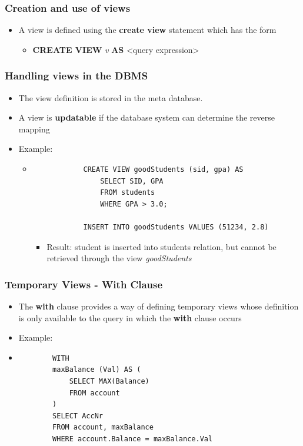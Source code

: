 \subsubsection{Creation and use of views}

\begin{itemize}
    \item A view is defined using the \textbf{create view} statement which has the form 
    \begin{itemize}
        \item[] \textbf{CREATE VIEW} \textit{v} \textbf{AS} <query expression>
    \end{itemize}
\end{itemize}

\subsubsection{Handling views in the DBMS}
\begin{itemize}
    \item The view definition is stored in the meta database.
    \item A view is \textbf{updatable} if the database system can determine the reverse mapping 
    \item Example:
    \begin{itemize}
        \item[] \begin{lstlisting}
            CREATE VIEW goodStudents (sid, gpa) AS
                SELECT SID, GPA
                FROM students
                WHERE GPA > 3.0;

            INSERT INTO goodStudents VALUES (51234, 2.8)                 
        \end{lstlisting}
        \begin{itemize}
            \item Result: student is inserted into students relation, but cannot be retrieved through the view \textit{goodStudents}
        \end{itemize}
    \end{itemize}
\end{itemize}

\subsubsection{Temporary Views - With Clause}
\begin{itemize}
    \item The \textbf{with} clause provides a way of defining temporary views whose definition is only available to the query in which the \textbf{with} clause occurs
    \item Example:
    \item[] \begin{lstlisting}
        WITH
        maxBalance (Val) AS (
            SELECT MAX(Balance)
            FROM account
        )
        SELECT AccNr
        FROM account, maxBalance
        WHERE account.Balance = maxBalance.Val
    \end{lstlisting}
\end{itemize}

